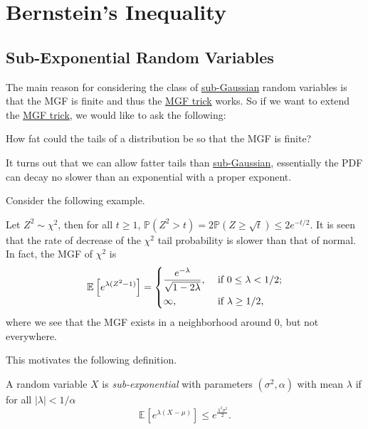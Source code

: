 \section{Bernstein's Inequality}
\subsection{Sub-Exponential Random Variables}
The main reason for considering the class of \hyperref[def:sub-Gaussian]{sub-Gaussian} random variables is that the MGF is finite and thus the \hyperref[lma:MGF-trick]{MGF trick} works. So if we want to extend the \hyperref[lma:MGF-trick]{MGF trick}, we would like to ask the following:

\begin{problem*}
	How fat could the tails of a distribution be so that the MGF is finite?
\end{problem*}
\begin{answer}
	It turns out that we can allow fatter tails than \hyperref[def:sub-Gaussian]{sub-Gaussian}, essentially the PDF can decay no slower than an exponential with a proper exponent.
\end{answer}

Consider the following example.

\begin{eg}
	Let \(Z^2 \sim \chi ^2\), then for all \(t \geq 1\), \(\mathbb{P} (Z^2 > t) = 2\mathbb{P} (Z \geq \sqrt{t} ) \leq 2 e^{-t / 2}\). It is seen that the rate of decrease of the \(\chi ^2\) tail probability is slower than that of normal. In fact, the MGF of \(\chi ^{2} \) is
	\[
		\mathbb{E}_{}\left[e^{\lambda (Z^2 - 1)} \right] =
		\begin{dcases}
			\frac{e^{-\lambda }}{\sqrt{1 - 2 \lambda } }, & \text{ if } 0 \leq \lambda < 1 / 2 ; \\
			\infty ,                                      & \text{ if } \lambda  \geq 1 / 2 ,
		\end{dcases}
	\]
	where we see that the MGF exists in a neighborhood around \(0\), but not everywhere.
\end{eg}

This motivates the following definition.

\begin{definition}\label{def:sub-exponential}
	A random variable \(X\) is \emph{sub-exponential} with parameters \((\sigma ^{2} , \alpha )\) with mean \(\lambda \) if for all \(\vert \lambda  \vert < 1 / \alpha \)
	\[
		\mathbb{E}_{}\left[e^{\lambda (X - \mu )} \right] \leq e^{\frac{\lambda ^{2} \sigma ^{2} }{2}}.
	\]
\end{definition}

